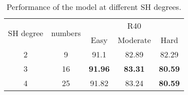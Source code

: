

\begin{table}[!h]
	\centering
	\caption{Performance of the model at different SH degrees.}
	\begin{tabular}{c|c|ccc} 
		\toprule
		\multirow{2}{*}{SH degree} & \multirow{2}{*}{numbers} & \multicolumn{3}{c}{R40}                           \\
		&                          & Easy           & Moderate       & Hard            \\ 
		\hline
		2                          & 9                        & 91.1           & 82.89          & 82.29           \\
		3                          & 16                       & \textbf{91.96} & \textbf{83.31} & \textbf{80.59}  \\
		4                          & 25                       & 91.82          & 83.24          & \textbf{80.59}  \\
		\bottomrule
	\end{tabular}
\label{tabel5}
\end{table}